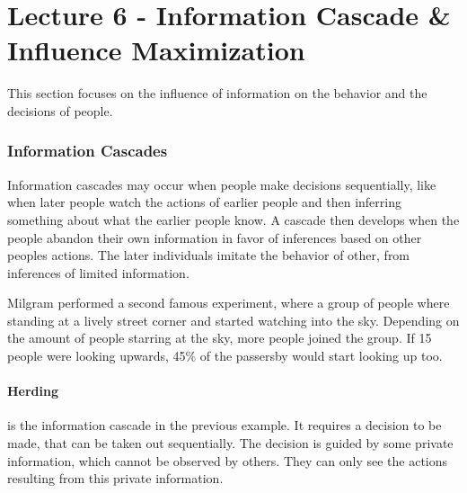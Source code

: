 \section{Lecture 6 - Information Cascade \& Influence Maximization} %
\label{sec:lecture_6_information_cascade_&_influence_maximization}

This section focuses on the influence of information on the behavior
and the decisions of people.

\subsubsection{Information Cascades} %
\label{ssub:information_cascades}
Information cascades may occur when people make decisions sequentially,
like when later people watch the actions of earlier people
and then inferring something about what the earlier people know.
A cascade then develops when the people abandon their own information
in favor of inferences based on other peoples actions.
The later individuals imitate the behavior of other,
from inferences of limited information.

Milgram performed a second famous experiment,
where a group of people where standing at a lively street corner
and started watching into the sky.
Depending on the amount of people starring at the sky,
more people joined the group.
If 15 people were looking upwards,
45\% of the passersby would start looking up too.

\paragraph{Herding} %
\label{par:herding}
is the information cascade in the previous example.
It requires a decision to be made,
that can be taken out sequentially.
The decision is guided by some private information,
which cannot be observed by others.
They can only see the actions resulting from this private information.
